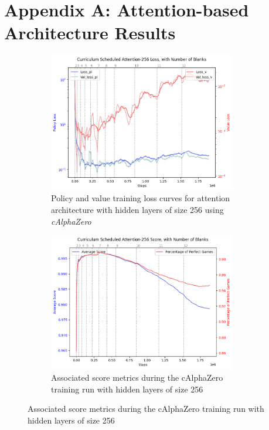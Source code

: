 \documentclass[10pt, reqno, letterpaper, twoside]{amsart}
\begin{document}
\clearpage
\printbibliography

\newpage
\appendix
\section{Appendix A: Attention-based Architecture Results}

\begin{figure}[ht]
    \centering
    \begin{subfigure}[b]{0.45\textwidth}
        \centering
        \includegraphics[width=0.9\textwidth]{images/Curriculum Scheduled Attention-256 Loss.png}
        \caption{Policy and value training loss curves for attention architecture with hidden layers of size 256 using \textit{cAlphaZero}}
        \label{fig:attention-256-loss}
    \end{subfigure}
    \hfill
    \begin{subfigure}[b]{0.45\textwidth}
        \centering
        \includegraphics[width=0.9\textwidth]{images/Curriculum Scheduled Attention-256 Score.png}
        \caption{Associated score metrics during the cAlphaZero training run with hidden layers of size 256}
        \label{fig:attention-256-score}
    \end{subfigure}
    

\end{figure}
\end{document}
